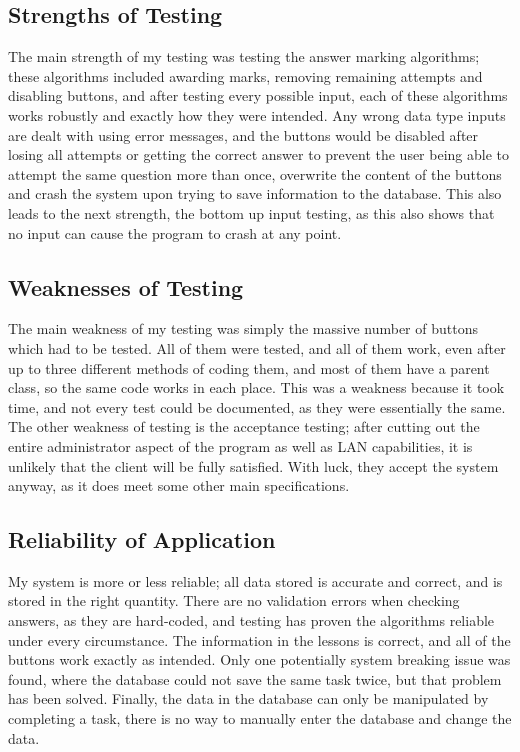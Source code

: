 \subsection{Strengths of Testing}

The main strength of my testing was testing the answer marking algorithms; these algorithms included awarding marks, removing remaining attempts and disabling buttons, and after testing every possible input, each of these algorithms works robustly and exactly how they were intended. Any wrong data type inputs are dealt with using error messages, and the buttons would be disabled after losing all attempts or getting the correct answer to prevent the user being able to attempt the same question more than once, overwrite the content of the buttons and crash the system upon trying to save information to the database. This also leads to the next strength, the bottom up input testing, as this also shows that no input can cause the program to crash at any point.

\subsection{Weaknesses of Testing}

The main weakness of my testing was simply the massive number of buttons which had to be tested. All of them were tested, and all of them work, even after up to three different methods of coding them, and most of them have a parent class, so the same code works in each place. This was a weakness because it took time, and not every test could be documented, as they were essentially the same. The other weakness of testing is the acceptance testing; after cutting out the entire administrator aspect of the program as well as LAN capabilities, it is unlikely that the client will be fully satisfied. With luck, they accept the system anyway, as it does meet some other main specifications.

\subsection{Reliability of Application}

My system is more or less reliable; all data stored is accurate and correct, and is stored in the right quantity. There are no validation errors when checking answers, as they are hard-coded, and testing has proven the algorithms reliable under every circumstance. The information in the lessons is correct, and all of the buttons work exactly as intended. Only one potentially system breaking issue was found, where the database could not save the same task twice, but that problem has been solved. Finally, the data in the database can only be manipulated by completing a task, there is no way to manually enter the database and change the data.

